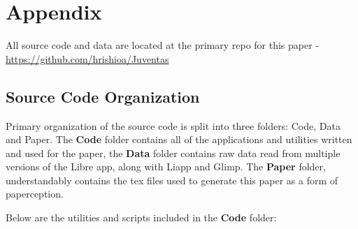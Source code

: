 \chapter{Appendix}

All source code and data are located at the primary repo for this paper - \url{https://github.com/hrishioa/Juventas}

\section{Source Code Organization}

Primary organization of the source code is split into three folders: Code, Data and Paper. The \textbf{Code} folder contains all of the applications and utilities written and used for the paper, the \textbf{Data} folder contains raw data read from multiple versions of the Libre app, along with Liapp and Glimp. The \textbf{Paper} folder, understandably contains the tex files used to generate this paper as a form of paperception.

Below are the utilities and scripts included in the \textbf{Code} folder:

